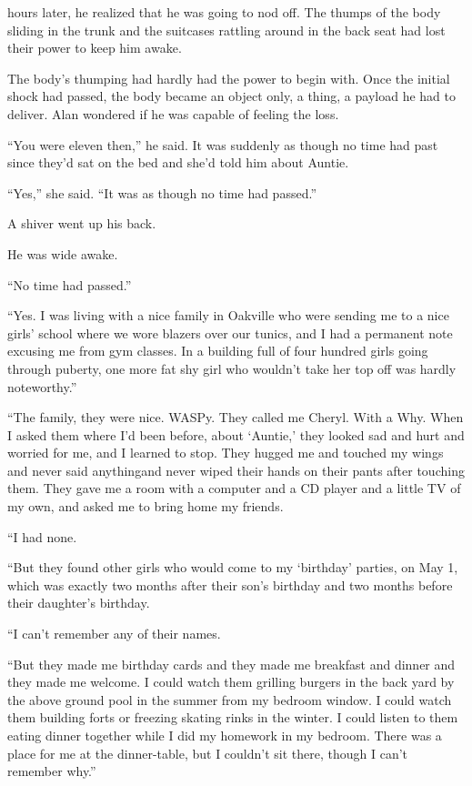  hours later, he realized that he was going to nod off.  The thumps
of the body sliding in the trunk and the suitcases rattling around in
the back seat had lost their power to keep him awake.

The body's thumping had hardly had the power to begin with.  Once the
initial shock had passed, the body became an object only, a thing, a
payload he had to deliver.  Alan wondered if he was capable of feeling
the loss.

``You were eleven then,'' he said.  It was suddenly as though no time
had past since they'd sat on the bed and she'd told him about Auntie.

``Yes,'' she said.  ``It was as though no time had passed.''

A shiver went up his back.

He was wide awake.

``No time had passed.''

``Yes.  I was living with a nice family in Oakville who were sending
me to a nice girls' school where we wore blazers over our tunics, and
I had a permanent note excusing me from gym classes.  In a building
full of four hundred girls going through puberty, one more fat shy
girl who wouldn't take her top off was hardly noteworthy.''

``The family, they were nice.  WASPy.  They called me Cheryl.  With a
Why.  When I asked them where I'd been before, about `Auntie,' they
looked sad and hurt and worried for me, and I learned to stop.  They
hugged me and touched my wings and never said anything\dash{}and never
wiped their hands on their pants after touching them.  They gave me a
room with a computer and a CD player and a little TV of my own, and
asked me to bring home my friends.

``I had none.

``But they found other girls who would come to my `birthday' parties,
on May 1, which was exactly two months after their son's birthday and
two months before their daughter's birthday.

``I can't remember any of their names.

``But they made me birthday cards and they made me breakfast and
dinner and they made me welcome.  I could watch them grilling burgers
in the back yard by the above ground pool in the summer from my
bedroom window.  I could watch them building forts or freezing skating
rinks in the winter.  I could listen to them eating dinner together
while I did my homework in my bedroom.  There was a place for me at
the dinner-table, but I couldn't sit there, though I can't remember
why.''

